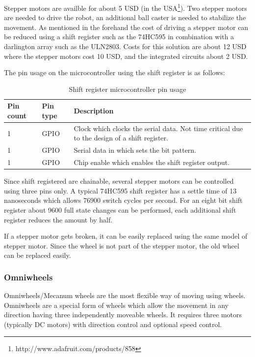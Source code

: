 \documentclass[11pt,a4paper]{article}
\begin{document}
Stepper motors are availble for about 5 USD (in the USA\footnote{http://www.adafruit.com/products/858}). Two stepper motors are needed to drive the robot, an additional ball caster is needed to stabilize the movement. As mentioned in the forehand the cost of driving a stepper motor can be reduced using a shift register such as the 74HC595 in combination with a darlington array such as the ULN2803. Costs for this solution are about 12 USD where the stepper motors cost 10 USD, and the integrated circuits about 2 USD.

The pin usage on the microcontroller using the shift register is as follows:

\begin{table}[H]
\centering
\begin{tabular}{p{}p{}p{}}
\toprule
Pin count & Pin type & Description \\
\midrule
1 & GPIO & Clock which clocks the serial data. Not time critical due to the design of a shift register.\\
1 & GPIO & Serial data in which sets the bit pattern.\\
1 & GPIO & Chip enable which enables the shift register output.\\
\bottomrule
\end{tabular}
\caption{Shift register microcontroller pin usage}
\label{tbl:74hc595_pin}
\end{table}

Since shift registered are chainable, several stepper motors can be controlled using three pins only. A typical 74HC595 shift register has a settle time of 13 nanoseconds which allows 76900 switch cycles per second. For an eight bit shift register about 9600 full state changes can be performed, each additional shift register reduces the amount by half.

If a stepper motor gets broken, it can be easily replaced using the same model of stepper motor. Since the wheel is not part of the stepper motor, the old wheel can be replaced easily.
\subsubsection{Omniwheels}
Omniwheels/Mecanum wheels are the most flexible way of moving using wheels. Omniwheels are a special form of wheels which allow the movement in any direction having three independently moveable wheels. It requires three motors (typically DC motors) with direction control and optional speed control.
\end{document}
